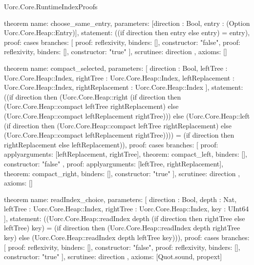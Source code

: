 \begin{lexlean}{Uorc.Core.RuntimeIndexProofs}
\begin{semanticmodule}
theorem{
  name: choose_same_entry,
  parameters: [direction : Bool, entry : (Option Uorc.Core.Heap::Entry)],
  statement: ((if direction then entry else entry) = entry),
  proof: cases{
    branches: [
      {proof: reflexivity{}, binders: [], constructor: "false"},
      {proof: reflexivity{}, binders: [], constructor: "true"}
    ],
    scrutinee: direction
  },
  axioms: []
}

theorem{
  name: compact_selected,
  parameters: [
    direction : Bool,
    leftTree : Uorc.Core.Heap::Index,
    rightTree : Uorc.Core.Heap::Index,
    leftReplacement : Uorc.Core.Heap::Index,
    rightReplacement : Uorc.Core.Heap::Index
  ],
  statement: ((if direction then (Uorc.Core.Heap::right (if direction then (Uorc.Core.Heap::compact leftTree rightReplacement) else (Uorc.Core.Heap::compact leftReplacement rightTree))) else (Uorc.Core.Heap::left (if direction then (Uorc.Core.Heap::compact leftTree rightReplacement) else (Uorc.Core.Heap::compact leftReplacement rightTree)))) = (if direction then rightReplacement else leftReplacement)),
  proof: cases{
    branches: [
      {
        proof: apply{arguments: [leftReplacement, rightTree], theorem: compact_left},
        binders: [],
        constructor: "false"
      },
      {
        proof: apply{arguments: [leftTree, rightReplacement], theorem: compact_right},
        binders: [],
        constructor: "true"
      }
    ],
    scrutinee: direction
  },
  axioms: []
}

theorem{
  name: readIndex_choice,
  parameters: [
    direction : Bool,
    depth : Nat,
    leftTree : Uorc.Core.Heap::Index,
    rightTree : Uorc.Core.Heap::Index,
    key : UInt64
  ],
  statement: ((Uorc.Core.Heap::readIndex depth (if direction then rightTree else leftTree) key) = (if direction then (Uorc.Core.Heap::readIndex depth rightTree key) else (Uorc.Core.Heap::readIndex depth leftTree key))),
  proof: cases{
    branches: [
      {proof: reflexivity{}, binders: [], constructor: "false"},
      {proof: reflexivity{}, binders: [], constructor: "true"}
    ],
    scrutinee: direction
  },
  axioms: [Quot.sound, propext]
}


\end{semanticmodule}
\end{lexlean}
